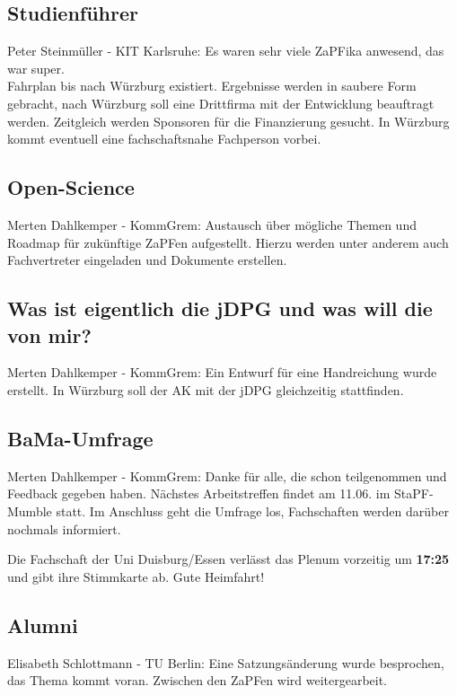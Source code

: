   \subsection{Studienführer}
    Peter Steinmüller - KIT Karlsruhe:  Es waren sehr viele ZaPFika anwesend, das war super. \\
    Fahrplan bis nach Würzburg existiert.
    Ergebnisse werden in saubere Form gebracht, nach Würzburg soll eine Drittfirma mit der Entwicklung beauftragt werden.
    Zeitgleich werden Sponsoren für die Finanzierung gesucht.
    In Würzburg kommt eventuell eine fachschaftsnahe Fachperson vorbei.

  \subsection{Open-Science}
    Merten Dahlkemper - KommGrem:  Austausch über mögliche Themen und Roadmap für zukünftige ZaPFen aufgestellt. Hierzu werden unter anderem auch Fachvertreter eingeladen und Dokumente erstellen.

  \subsection{Was ist eigentlich die jDPG und was will die von mir?}
    Merten Dahlkemper - KommGrem:  Ein Entwurf für eine Handreichung wurde erstellt. In Würzburg soll der AK mit der jDPG gleichzeitig stattfinden.

  \subsection{BaMa-Umfrage}
    Merten Dahlkemper - KommGrem:  Danke für alle, die schon teilgenommen und Feedback gegeben haben.
    Nächstes Arbeitstreffen findet am 11.06. im StaPF-Mumble statt.
    Im Anschluss geht die Umfrage los, Fachschaften werden darüber nochmals informiert.

  \begin{info}{}
    Die Fachschaft der Uni Duisburg/Essen verlässt das Plenum vorzeitig um \textbf{17:25} und gibt ihre Stimmkarte ab. Gute Heimfahrt!
  \end{info}

  \subsection{Alumni}
    Elisabeth Schlottmann - TU Berlin:  Eine Satzungsänderung wurde besprochen, das Thema kommt voran. Zwischen den ZaPFen wird weitergearbeit.

